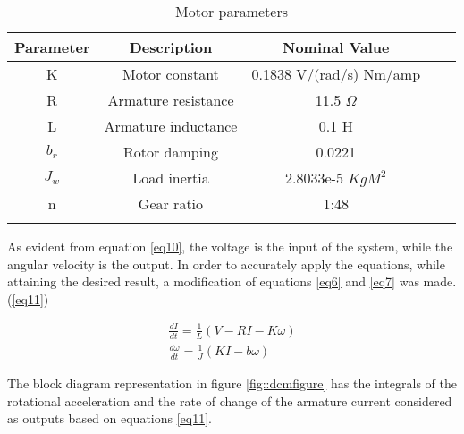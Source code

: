 {\begin{table}[h]
\centering
\begin{tabular}{cccll}
\hline
Parameter                   & Description                               & Nominal Value                                 &  &  \\ \hline
\multicolumn{1}{|c|}{K}     & \multicolumn{1}{c|}{Motor constant}       & \multicolumn{1}{c|}{0.1838 V/(rad/s)  Nm/amp} &  &  \\ \cline{1-3}
\multicolumn{1}{|c|}{R}     & \multicolumn{1}{c|}{Armature resistance}  & \multicolumn{1}{c|}{11.5 $\Omega$}            &  &  \\ \cline{1-3}
\multicolumn{1}{|c|}{L}     & \multicolumn{1}{c|}{Armature inductance}  & \multicolumn{1}{c|}{0.1 H}                    &  &  \\ \cline{1-3}
\multicolumn{1}{|c|}{$b_r$} & \multicolumn{1}{c|}{Rotor damping}        & \multicolumn{1}{c|}{0.0221}                   &  &  \\ \cline{1-3}
\multicolumn{1}{|c|}{$J_w$} & \multicolumn{1}{c|}{Load inertia} & \multicolumn{1}{c|}{2.8033e-5 $KgM^2$}        &  &  \\ \cline{1-3}
\multicolumn{1}{|c|}{n}     & \multicolumn{1}{c|}{Gear ratio}           & \multicolumn{1}{c|}{1:48}                     &  &  \\ \cline{1-3}
\multicolumn{1}{l}{}        & \multicolumn{1}{l}{}                      & \multicolumn{1}{l}{}                          &  &  \\ \hline
\end{tabular}
\caption{Motor parameters}
\label{motor_par}
\end{table}

As evident from equation \ref{eq10}, the voltage is the input of the system, while the angular velocity is the output. In order to accurately apply the equations, while attaining the desired result, a modification of equations \ref{eq6} and \ref{eq7} was made.(\ref{eq11})

\begin{align}
\frac{dI}{dt} = \frac{1}{L}(V - RI - K\omega)\label{eq11} \\
\frac{d\omega}{dt} = \frac{1}{J}(KI - b\omega) \nonumber
\end{align}

The block diagram representation in figure \ref{fig::dcmfigure} has the integrals of the rotational acceleration and the rate of change of the armature current considered as outputs based on equations \ref{eq11}.

}
